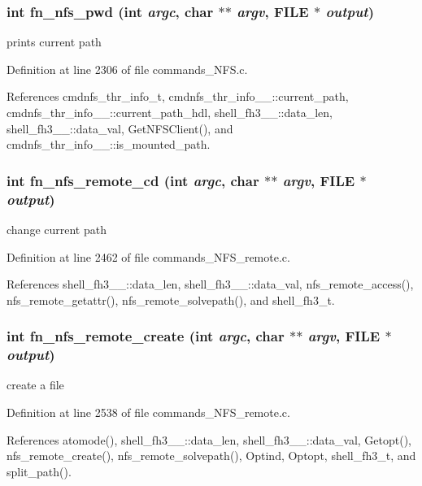 \subsubsection{\setlength{\rightskip}{0pt plus 5cm}int fn\_\-nfs\_\-pwd (int {\em argc}, char $\ast$$\ast$ {\em argv}, FILE $\ast$ {\em output})}\label{commands_8h_a69}


prints current path 

Definition at line 2306 of file commands\_\-NFS.c.

References cmdnfs\_\-thr\_\-info\_\-t, cmdnfs\_\-thr\_\-info\_\-\_\-::current\_\-path, cmdnfs\_\-thr\_\-info\_\-\_\-::current\_\-path\_\-hdl, shell\_\-fh3\_\-\_\-::data\_\-len, shell\_\-fh3\_\-\_\-::data\_\-val, Get\-NFSClient(), and cmdnfs\_\-thr\_\-info\_\-\_\-::is\_\-mounted\_\-path.
\subsubsection{\setlength{\rightskip}{0pt plus 5cm}int fn\_\-nfs\_\-remote\_\-cd (int {\em argc}, char $\ast$$\ast$ {\em argv}, FILE $\ast$ {\em output})}\label{commands_8h_a86}


change current path 

Definition at line 2462 of file commands\_\-NFS\_\-remote.c.

References shell\_\-fh3\_\-\_\-::data\_\-len, shell\_\-fh3\_\-\_\-::data\_\-val, nfs\_\-remote\_\-access(), nfs\_\-remote\_\-getattr(), nfs\_\-remote\_\-solvepath(), and shell\_\-fh3\_\-t.
\subsubsection{\setlength{\rightskip}{0pt plus 5cm}int fn\_\-nfs\_\-remote\_\-create (int {\em argc}, char $\ast$$\ast$ {\em argv}, FILE $\ast$ {\em output})}\label{commands_8h_a91}


create a file 

Definition at line 2538 of file commands\_\-NFS\_\-remote.c.

References atomode(), shell\_\-fh3\_\-\_\-::data\_\-len, shell\_\-fh3\_\-\_\-::data\_\-val, Getopt(), nfs\_\-remote\_\-create(), nfs\_\-remote\_\-solvepath(), Optind, Optopt, shell\_\-fh3\_\-t, and split\_\-path().
